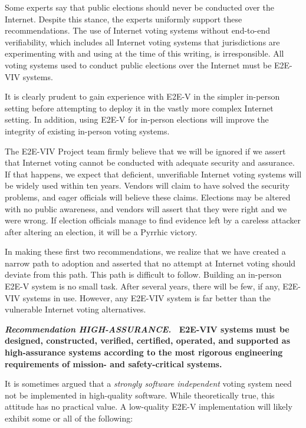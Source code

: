 Some experts say that public elections should never be conducted over
the Internet. Despite this stance, the experts uniformly support these
recommendations. The use of Internet voting systems without end-to-end
verifiability, which includes all Internet voting systems that
jurisdictions are experimenting with and using at the time of this
writing, is irresponsible. All voting systems used to conduct public
elections over the Internet must be E2E-VIV systems.

It is clearly prudent to gain experience with E2E-V in the simpler
in-person setting before attempting to deploy it in the vastly more
complex Internet setting. In addition, using E2E-V for in-person
elections will improve the integrity of existing in-person voting
systems.
 
The E2E-VIV Project team firmly believe that we will be ignored if we
assert that Internet voting cannot be conducted with adequate security
and assurance. If that happens, we expect that deficient, unverifiable
Internet voting systems will be widely used within ten years.  Vendors
will claim to have solved the security problems, and eager officials
will believe these claims.  Elections may be altered with no public
awareness, and vendors will assert that they were right and we were
wrong.  If election officials manage to find evidence left by a
careless attacker after altering an election, it will be a Pyrrhic
victory.
 
In making these first two recommendations, we realize that we have
created a narrow path to adoption and asserted that no attempt at
Internet voting should deviate from this path.  This path is difficult
to follow.  Building an in-person E2E-V system is no small task.
After several years, there will be few, if any, E2E-VIV systems in
use.  However, any E2E-VIV system is far better than the vulnerable
Internet voting alternatives. 

\vspace{12pt} 
\textbf{\emph{Recommendation HIGH-ASSURANCE.} \ E2E-VIV systems must
  be designed, constructed, verified, certified, operated, and
  supported as high-assurance systems according to the most rigorous
  engineering requirements of mission- and safety-critical systems.}

It is sometimes argued that a \emph{strongly software independent}
voting system need not be implemented in high-quality software. While
theoretically true, this attitude has no practical value. A
low-quality E2E-V implementation will likely exhibit some or all of
the following:


